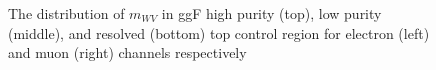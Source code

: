 \begin{figure}[ht]
	\caption{The distribution of $m_{WV}$ in ggF high purity (top), low purity (middle), and resolved (bottom) top control region for electron (left) and muon (right) channels respectively}
	 \label{Fig:ggFTR}
\end{figure}


